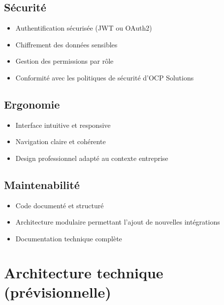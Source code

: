 \documentclass[12pt,a4paper]{article}
\begin{document}
\subsection{S\'ecurit\'e}
\begin{itemize}[leftmargin=2cm, itemsep=3pt]
    \item[\textcolor{accent}{$\blacktriangleright$}] Authentification s\'ecuris\'ee (JWT ou OAuth2)
    \item[\textcolor{accent}{$\blacktriangleright$}] Chiffrement des donn\'ees sensibles
    \item[\textcolor{accent}{$\blacktriangleright$}] Gestion des permissions par r\^ole
    \item[\textcolor{accent}{$\blacktriangleright$}] Conformit\'e avec les politiques de s\'ecurit\'e d'OCP Solutions
\end{itemize}

\subsection{Ergonomie}
\begin{itemize}[leftmargin=2cm, itemsep=3pt]
    \item[\textcolor{accent}{$\blacktriangleright$}] Interface intuitive et responsive
    \item[\textcolor{accent}{$\blacktriangleright$}] Navigation claire et coh\'erente
    \item[\textcolor{accent}{$\blacktriangleright$}] Design professionnel adapt\'e au contexte entreprise
\end{itemize}

\subsection{Maintenabilit\'e}
\begin{itemize}[leftmargin=2cm, itemsep=3pt]
    \item[\textcolor{accent}{$\blacktriangleright$}] Code document\'e et structur\'e
    \item[\textcolor{accent}{$\blacktriangleright$}] Architecture modulaire permettant l'ajout de nouvelles int\'egrations
    \item[\textcolor{accent}{$\blacktriangleright$}] Documentation technique compl\`ete
\end{itemize}

\section{Architecture technique (pr\'evisionnelle)}
\end{document}
